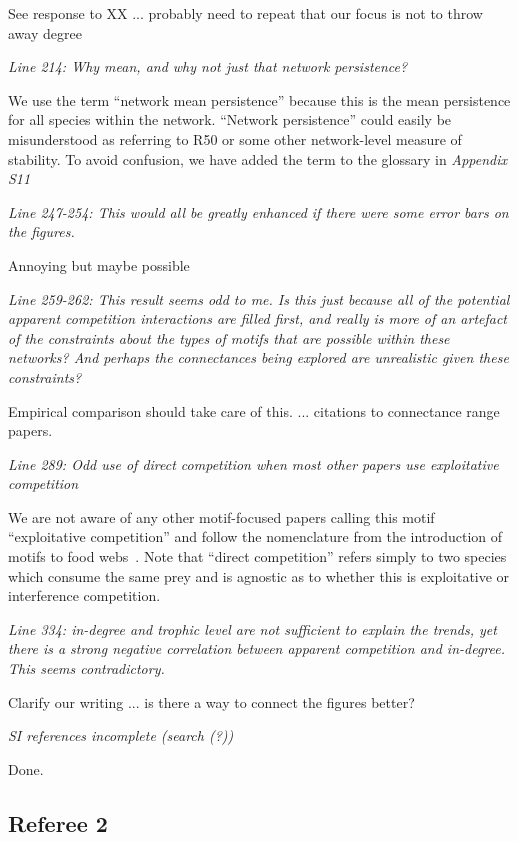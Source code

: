 \documentclass[12pt]{article}
\newcommand{\us}{\rm \setlength{\leftskip}{0.3cm} \setlength{\rightskip}{0.3cm}}
\newcommand{\them}{\it \setlength{\leftskip}{0cm} \setlength{\rightskip}{0cm}}
\begin{document}
\us See response to XX ... probably need to repeat that our focus is not to throw away degree

\them
Line 214: Why mean, and why not just that network persistence?

\us We use the term ``network mean persistence'' because this is the mean persistence for all species within the network. ``Network persistence'' could easily be misunderstood as referring to R50 or some other network-level measure of stability. To avoid confusion, we have added the term to the glossary in \emph{Appendix S11}


\them
Line 247-254: This would all be greatly enhanced if there were some error bars on the figures.

\us Annoying but maybe possible

\them
Line 259-262: This result seems odd to me. Is this just because all of the potential apparent competition interactions are filled first, and really is more of an artefact of the constraints about the types of motifs that are possible within these networks? And perhaps the connectances being explored are unrealistic given these constraints?

\us Empirical comparison should take care of this. ... citations to connectance range papers.

\them
Line 289: Odd use of direct competition when most other papers use exploitative competition

\us We are not aware of any other motif-focused papers calling this motif ``exploitative competition'' and follow the nomenclature from the introduction of motifs to food webs~\citep{Stouffer2007}.
Note that ``direct competition'' refers simply to two species which consume the same prey and is agnostic as to whether this is exploitative or interference competition.


\them
Line 334: in-degree and trophic level are not sufficient to explain the trends, yet there is a strong negative correlation between apparent competition and in-degree. This seems contradictory.

\us Clarify our writing ... is there a way to connect the figures better?

\them
SI references incomplete (search (?))

\us
Done.

\subsection*{Referee 2}
\end{document}
